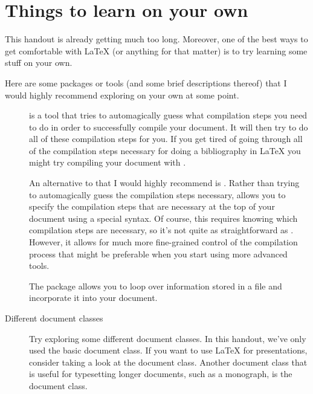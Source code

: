 
\section{Things to learn on your own}
\label{sec:things-to-learn-on-your-own}

This handout is already getting much too long.
Moreover, one of the best ways to get comfortable with \LaTeX{} (or anything for that matter) is to try learning some stuff on your own.

Here are some packages or tools (and some brief descriptions thereof) that I would highly recommend exploring on your own at some point.

\begin{description}

	\item[]{%
		\href{https://www.ctan.org/pkg/latexmk}{} is a tool that tries to automagically guess what compilation steps you need to do in order to successfully compile your document.
		It will then try to do all of these compilation steps for you.
		If you get tired of going through all of the compilation steps necessary for doing a bibliography in \LaTeX{} you might try compiling your document with .%
	}
	
	\item[]{%
		An alternative to  that I would highly recommend is \href{https://www.ctan.org/pkg/arara}{}.
		Rather than trying to automagically guess the compilation steps necessary,  allows you to specify the compilation steps that are necessary at the top of your document using a special syntax.
		Of course, this requires knowing which compilation steps are necessary, so it's not quite as straightforward as .
		However, it allows for much more fine-grained control of the compilation process that might be preferable when you start using more advanced tools.%
	}
	
	\item[]{%
		The \href{https://www.ctan.org/pkg/datatool}{} package allows you to loop over information stored in a  file and incorporate it into your  document.%
	}
	
	\item[Different document classes]{%
		Try exploring some different document classes.
		In this handout, we've only used the basic  document class.
		If you want to use \LaTeX{} for presentations, consider taking a look at the \href{https://ctan.org/pkg/beamer}{} document class.
		Another document class that is useful for typesetting longer documents, such as a monograph, is the \href{https://ctan.org/pkg/memoir}{} document class.%
	}
	

\end{description}
